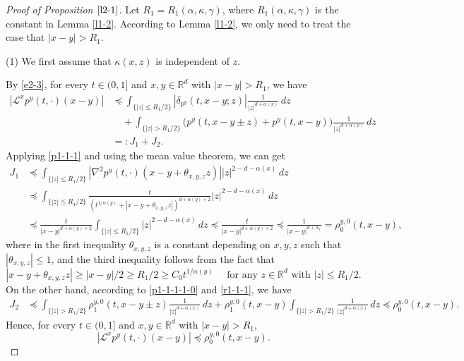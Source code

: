 \documentclass[a4paper,11pt]{amsart}
\renewcommand{\le}{\leqslant}
\renewcommand{\ge}{\geqslant}
\newcommand{\R}{\mathds R}
\newcommand{\p}{\preceq}
\newcommand{\K}{\kappa}
\newcommand{\A}{\alpha}
\newcommand{\G}{\gamma}
\def\LL{{\mathcal L}}
\theoremstyle{definition}
\begin{document}
\begin{proof}[Proof of Proposition $\ref{l2-1}$]
Let $R_1=R_1(\A,\K,\G)$, where $R_1(\A,\K,\G)$ is the constant in
Lemma \ref{l1-2}. According to Lemma \ref{l1-2},  we only need to
treat the case that $|x-y|> R_1$.

(1)  We first assume that $\K(x,z)$ is independent of $z$.


By \eqref{e2-3}, for every $t\in (0,1]$ and $x,y \in \R^d$ with $|x-y|>R_1$, we have
\begin{equation}\label{l2-1-3a}
\begin{split}
 | \LL^x p^y(t,\cdot)(x-y)|
& \p \int_{\{|z|\le {R_1}/{2}\}}|\delta_{p^y}(t,x-y;z)|\frac{1}{|z|^{d+\A(x)}}\,dz\\
&\quad +\int_{\{|z|>{R_1}/{2}\}} \big(p^y(t,x-y\pm z)+p^y(t,x-y)\big)\frac{1}{|z|^{d+\A(x)}}\,dz\\
&=:J_1+J_2.
\end{split}
\end{equation}
Applying \eqref{p1-1-1} and using the mean value theorem, we can get
\begin{align*}
J_1&\p \int_{\{|z|\le {R_1}/{2}\}}|\nabla^2 p^y(t,\cdot)(x-y+\theta_{x,y,z}z)||z|^{2-d-\A(x)}\, dz\\
&\p \int_{\{|z|\le {R_1}/{2}\}}\frac{t}{(t^{{1/\A(y)}}+|x-y+\theta_{x,y, z}z|)^{d+\A(y)+2}}
|z|^{2-d-\A(x)}\, dz\\
&\p \frac{t}{|x-y|^{d+\A(y)+2}}\int_{\{|z|\le
{R_1}/{2}\}}|z|^{2-d-\A(x)}\, dz\p
\frac{t}{|x-y|^{d+\A(y)+2}}\p \frac{1}{|x-y|^{d+\A_1}}=\rho_0^{y,0}(t,x-y),
\end{align*}
where in the first inequality $\theta_{x,y,z}$ is a constant depending on
$x,y,z$ such that $|\theta_{x,y,z}|\le 1$, and the third inequality follows
from the fact that $$|x-y+\theta_{x,y,z}z|\ge {|x-y|}/{2}\ge
{R_1}/{2} \ge C_0 t^{{1/\A(y)}}\quad\textrm{ for any } z\in \R^d\textrm{ with } |z|\le
{R_1}/{2}.$$
On the other hand, according to \eqref{p1-1-1-1-0} and \eqref{r1-1-1}, we have
\begin{equation}\label{e:ref1}
\begin{split}
J_2&\p \int_{\{|z|>{R_1}/{2}\}}\rho^{y,0}_1(t,x-y\pm z)\frac{1}{|z|^{d+\A(x)}}\,dz +
\rho^{y,0}_1(t,x-y) \int_{\{|z|>{R_1}/{2}\}}\frac{1}{|z|^{d+\A(x)}}\,dz \p  \rho^{y,0}_0(t,x-y).
\end{split}
\end{equation}
Hence, for every $t\in (0,1]$ and $x,y\in\R^d$ with $|x-y|>R_1$,
$$| \LL^x p^y(t,\cdot)(x-y)|\p\rho^{y,0}_0(t,x-y).$$



\end{proof}
\end{document}
